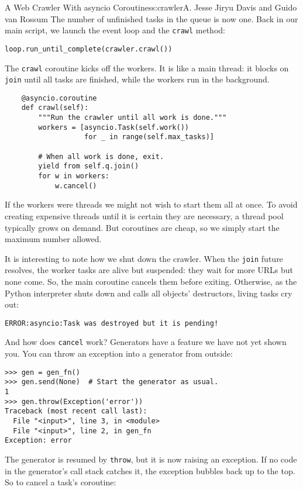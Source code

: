 \begin{aosachapter}{A Web Crawler With asyncio Coroutines}{s:crawler}{A. Jesse Jiryu Davis and Guido van Rossum}
The number of unfinished tasks in the queue is now one. Back in our main
script, we launch the event loop and the \texttt{crawl} method:

\begin{verbatim}
loop.run_until_complete(crawler.crawl())
\end{verbatim}

The \texttt{crawl} coroutine kicks off the workers. It is like a main
thread: it blocks on \texttt{join} until all tasks are finished, while
the workers run in the background.

\begin{verbatim}
    @asyncio.coroutine
    def crawl(self):
        """Run the crawler until all work is done."""
        workers = [asyncio.Task(self.work())
                   for _ in range(self.max_tasks)]

        # When all work is done, exit.
        yield from self.q.join()
        for w in workers:
            w.cancel()
\end{verbatim}

If the workers were threads we might not wish to start them all at once.
To avoid creating expensive threads until it is certain they are
necessary, a thread pool typically grows on demand. But coroutines are
cheap, so we simply start the maximum number allowed.

It is interesting to note how we shut down the crawler. When the
\texttt{join} future resolves, the worker tasks are alive but suspended:
they wait for more URLs but none come. So, the main coroutine cancels
them before exiting. Otherwise, as the Python interpreter shuts down and
calls all objects' destructors, living tasks cry out:

\begin{verbatim}
ERROR:asyncio:Task was destroyed but it is pending!
\end{verbatim}

And how does \texttt{cancel} work? Generators have a feature we have not
yet shown you. You can throw an exception into a generator from outside:

\begin{verbatim}
>>> gen = gen_fn()
>>> gen.send(None)  # Start the generator as usual.
1
>>> gen.throw(Exception('error'))
Traceback (most recent call last):
  File "<input>", line 3, in <module>
  File "<input>", line 2, in gen_fn
Exception: error
\end{verbatim}

The generator is resumed by \texttt{throw}, but it is now raising an
exception. If no code in the generator's call stack catches it, the
exception bubbles back up to the top. So to cancel a task's coroutine:


\end{aosachapter}
